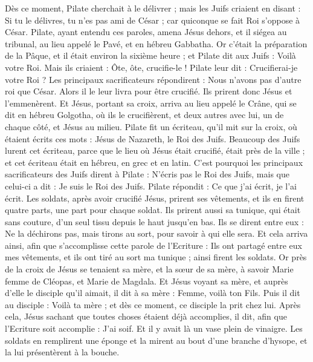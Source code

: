 \begin{multicols}{2}
Dès ce moment, Pilate cherchait à le délivrer ; mais les Juifs criaient en disant : Si tu le délivres, tu n'es pas ami de César ; car quiconque se fait Roi s'oppose à César.
Pilate, ayant entendu ces paroles, amena Jésus dehors, et il siégea au tribunal, au lieu appelé le Pavé, et en hébreu Gabbatha.
Or c'était la préparation de la Pâque, et il était environ la sixième heure ; et Pilate dit aux Juifs : Voilà votre Roi.
Mais ils criaient : Ôte, ôte, crucifie-le ! Pilate leur dit : Crucifierai-je votre Roi ? Les principaux sacrificateurs répondirent : Nous n'avons pas d'autre roi que César.
Alors il le leur livra pour être crucifié. Ils prirent donc Jésus et l'emmenèrent.
Et Jésus, portant sa croix, arriva au lieu appelé le Crâne, qui se dit en hébreu Golgotha,
où ils le crucifièrent, et deux autres avec lui, un de chaque côté, et Jésus au milieu.
Pilate fit un écriteau, qu'il mit sur la croix, où étaient écrits ces mots : Jésus de Nazareth, le Roi des Juifs.
Beaucoup des Juifs lurent cet écriteau, parce que le lieu où Jésus était crucifié, était près de la ville ; et cet écriteau était en hébreu, en grec et en latin.
C'est pourquoi les principaux sacrificateurs des Juifs dirent à Pilate : N'écris pas le Roi des Juifs, mais que celui-ci a dit : Je suis le Roi des Juifs.
Pilate répondit : Ce que j'ai écrit, je l'ai écrit.
Les soldats, après avoir crucifié Jésus, prirent ses vêtements, et ils en firent quatre parts, une part pour chaque soldat. Ils prirent aussi sa tunique, qui était sans couture, d'un seul tissu depuis le haut jusqu'en bas.
Ils se dirent entre eux : Ne la déchirons pas, mais tirons au sort, pour savoir à qui elle sera. Et cela arriva ainsi, afin que s'accomplisse cette parole de l'Ecriture : Ils ont partagé entre eux mes vêtements, et ils ont tiré au sort ma tunique ; ainsi firent les soldats.
Or près de la croix de Jésus se tenaient sa mère, et la sœur de sa mère, à savoir Marie femme de Cléopas, et Marie de Magdala.
Et Jésus voyant sa mère, et auprès d'elle le disciple qu'il aimait, il dit à sa mère : Femme, voilà ton Fils.
Puis il dit au disciple : Voilà ta mère ; et dès ce moment, ce disciple la prit chez lui.
Après cela, Jésus sachant que toutes choses étaient déjà accomplies, il dit, afin que l'Ecriture soit accomplie : J'ai soif.
Et il y avait là un vase plein de vinaigre. Les soldats en remplirent une éponge et la mirent au bout d'une branche d'hysope, et la lui présentèrent à la bouche.

\end{multicols}
